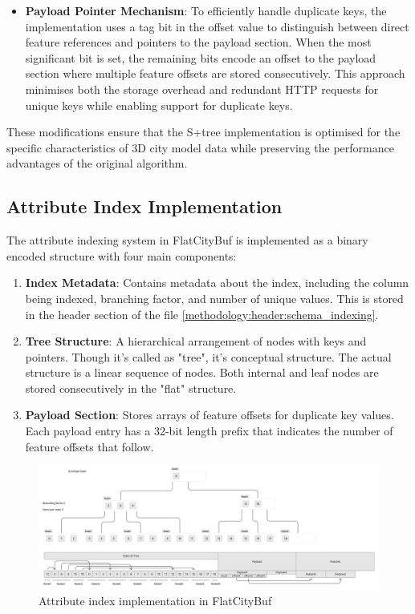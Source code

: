 \begin{itemize}
\item \textbf{Payload Pointer Mechanism}: To efficiently handle duplicate keys, the implementation uses a tag bit in the offset value to distinguish between direct feature references and pointers to the payload section. When the most significant bit is set, the remaining bits encode an offset to the payload section where multiple feature offsets are stored consecutively. This approach minimises both the storage overhead and redundant HTTP requests for unique keys while enabling support for duplicate keys.

\end{itemize}

These modifications ensure that the S+tree implementation is optimised for the specific characteristics of 3D city model data while preserving the performance advantages of the original algorithm.

\subsection{Attribute Index Implementation}
\label{methodology:attribute_index:implementation}

The attribute indexing system in FlatCityBuf is implemented as a binary encoded structure with four main components:

\begin{enumerate}
\item \textbf{Index Metadata}: Contains metadata about the index, including the column being indexed, branching factor, and number of unique values. This is stored in the header section of the file \autoref{methodology:header:schema_indexing}.
\item \textbf{Tree Structure}: A hierarchical arrangement of nodes with keys and pointers. Though it's called as "tree", it's conceptual structure. The actual structure is a linear sequence of nodes. Both internal and leaf nodes are stored consecutively in the "flat" structure.
\item \textbf{Payload Section}: Stores arrays of feature offsets for duplicate key values. Each payload entry has a 32-bit length prefix that indicates the number of feature offsets that follow.
\end{enumerate}

\begin{figure}[htbp]
\centering
\includegraphics[width=1.0\textwidth]{figs/methodology/attribute_index.png}
\caption{Attribute index implementation in FlatCityBuf}
\label{fig:methodology:attribute_index}
\end{figure}

